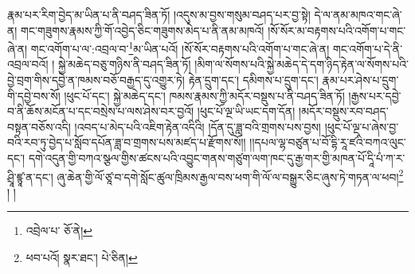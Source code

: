 རྣམ་པར་རིག་བྱེད་མ་ཡིན་པ་ནི་བཤད་ཟིན་ཏོ། །འདུས་མ་བྱས་གསུམ་བཤད་པར་བྱ་སྟེ། དེ་ལ་ནམ་མཁའ་གང་ཞེ་ན། གང་གཟུགས་རྣམས་ཀྱི་གོ་འབྱེད་ཅིང་གཟུགས་མེད་པ་ནི་ནམ་མཁའོ། །སོ་སོར་མ་བརྟགས་པའི་འགོག་པ་གང་ཞེ་ན། གང་འགོག་པ་ལ་:འབྲལ་བ་\footnote{འབྲེལ་པ་  ཅོ་ནེ། }མ་ཡིན་པའོ། །སོ་སོར་བརྟགས་པའི་འགོག་པ་གང་ཞེ་ན། གང་འགོག་པ་དེ་ནི་འབྲལ་བའོ། །
སྐྱེ་མཆེད་བཅུ་གཉིས་ནི་བཤད་ཟིན་ཏོ། །མིག་ལ་སོགས་པའི་སྐྱེ་མཆེད་དེ་དག་ཉིད་རྟེན་ལ་སོགས་པའི་བྱེ་བྲག་གིས་དབྱེ་ན་ཁམས་བཅོ་བརྒྱད་དུ་འགྱུར་ཏེ། རྟེན་དྲུག་དང་། དམིགས་པ་དྲུག་དང་། རྣམ་པར་ཤེས་པ་དྲུག་གི་དབྱེ་བས་སོ། །ཕུང་པོ་དང་། སྐྱེ་མཆེད་དང་། ཁམས་རྣམས་ཀྱི་མདོར་བསྡུས་པ་ནི་བཤད་ཟིན་ཏོ། །རྒྱས་པར་དབྱེ་བ་ནི་ཆོས་མངོན་པ་དང་བསྲེས་པ་ལས་ཤེས་བར་བྱའོ། །ཕུང་པོ་ལྔ་ཡི་ཡང་དག་དོན། །མདོར་བསྡུས་རབ་བཤད་བསྟན་བཅོས་འདི། །འབད་པ་མེད་པའི་འཇིག་རྟེན་འདིའི། །དོན་དུ་ཟླ་བའི་གྲགས་པས་བྱས། །ཕུང་པོ་ལྔ་པ་ཞེས་བྱ་བའི་རབ་ཏུ་བྱེད་པ་སློབ་དཔོན་ཟླ་བ་གྲགས་པས་མཛད་པ་རྫོགས་སོ།། །།དཔལ་ལྷ་བཙུན་པ་བོ་དྷི་རཱ་ཛའི་བཀའ་ལུང་དང་། དགེ་འདུན་གྱི་བཀའ་སྩལ་གྱིས་ཚངས་པའི་འབྱུང་གནས་གཙུག་ལག་ཁང་དུ་རྒྱ་གར་གྱི་མཁན་པོ་དཱི་པཾ་ཀ་ར་ཤྲཱི་ཛྙཱ་ན་དང་། ཞུ་ཆེན་གྱི་ལོ་ཙཱ་བ་དགེ་སློང་ཚུལ་ཁྲིམས་རྒྱལ་བས་ཕག་གི་ལོ་ལ་བསྒྱུར་ཅིང་ཞུས་ཏེ་གཏན་ལ་ཕབ།\footnote{ཕབ་པའོ།  སྣར་ཐང་།  པེ་ཅིན། } ། །